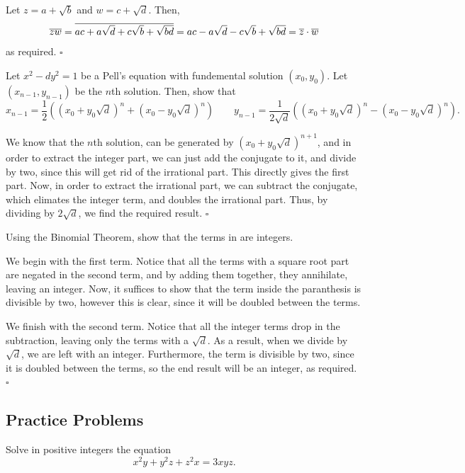 \documentclass{article}
\begin{document}
Let $z = a+\sqrt{b}$ and $w = c+\sqrt{d}$. Then, \[\overline{zw} = \overline{ac+a\sqrt{d}+c\sqrt{b}+\sqrt{bd}} = ac-a\sqrt{d}-c\sqrt{b}+\sqrt{bd} = \overline{z}\cdot\overline{w}\] as required. $\square$

\newpage

\begin{problem}[4.8.2]{}
Let $x^2-dy^2 = 1$ be a Pell's equation with fundemental solution $(x_0, y_0)$. Let $(x_{n-1}, y_{n-1})$ be the $n$th solution. Then, show that \[x_{n-1} = \dfrac{1}{2}\left((x_0+y_0\sqrt{d})^n+(x_0-y_0\sqrt{d})^n\right) \qquad y_{n-1} = \dfrac{1}{2\sqrt{d}}\left((x_0+y_0\sqrt{d})^n-(x_0-y_0\sqrt{d})^n\right).\]
\end{problem}

We know that the $n$th solution, can be generated by $(x_0+y_0\sqrt{d})^{n+1}$, and in order to extract the integer part, we can just add the conjugate to it, and divide by two, since this will get rid of the irrational part. This directly gives the first part. Now, in order to extract the irrational part, we can subtract the conjugate, which elimates the integer term, and doubles the irrational part. Thus, by dividing by $2\sqrt{d}$, we find the required result. $\square$

\begin{problem}[4.8.3]{}
Using the Binomial Theorem, show that the terms in  are integers.
\end{problem}

We begin with the first term. Notice that all the terms with a square root part are negated in the second term, and by adding them together, they annihilate, leaving an integer. Now, it suffices to show that the term inside the paranthesis is divisible by two, however this is clear, since it will be doubled between the terms.

We finish with the second term. Notice that all the integer terms drop in the subtraction, leaving only the terms with a $\sqrt{d}$. As a result, when we divide by $\sqrt{d}$, we are left with an integer. Furthermore, the term is divisible by two, since it is doubled between the terms, so the end result will be an integer, as required. $\square$

\subsection{Practice Problems}

\begin{problem}[4.9.1]{}
Solve in positive integers the equation \[x^2y+y^2z+z^2x = 3xyz.\]
\end{problem}
\end{document}
